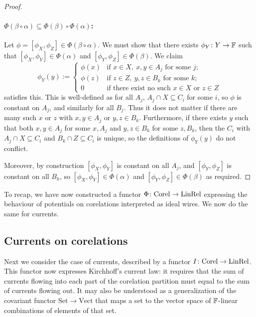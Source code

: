 \begin{proof}
  \paragraph{$\Phi(\beta\circ\alpha) \subseteq \Phi(\beta) \circ \Phi(\alpha)$:}
  Let $\phi = [\phi_X,\phi_Z] \in \Phi(\beta\circ\alpha)$. We must show that there
  exists $\phi_Y{\colon} Y \to {\mathbb F}$ such that $[\phi_X,\phi_Y] \in \Phi(\alpha)$ and
  $[\phi_Y,\phi_Z] \in \Phi(\beta)$. We claim
  \[
    \phi_Y(y):= \begin{cases}
      \phi(x) & \mbox{if } x \in X, \: x,y \in A_j \mbox{ for some }j;\\
      \phi(z) & \mbox{if } z \in Z, \: y,z \in B_k \mbox{ for some }k;\\
      0 & \mbox{if there exist no such }x \in X \mbox{ or }z \in Z
    \end{cases}
  \]
  satisfies this. This is well-defined as for all $A_j$, $A_j \cap X \subseteq
  C_i$ for some $i$, so $\phi$ is constant on $A_j$, and similarly for all $B_j$.
  Thus it does not matter if there are many such $x$ or $z$ with $x, y \in A_j$ or
  $y,z \in B_k$.  Furthermore, if there exists $y$ such that both $x,y \in A_j$
  for some $x,A_j$ and $y,z \in B_k$ for some $z,B_k$, then the $C_i$ with $A_j
  \cap X \subseteq C_i$ and $B_k \cap Z \subseteq C_i$ is unique, so the
  definitions of $\phi_Y(y)$ do not conflict.

  Moreover, by construction $[\phi_X,\phi_Y]$ is constant on all $A_j$, and
  $[\phi_Y,\phi_Z]$ is constant on all $B_k$, so $[\phi_X,\phi_Y] \in
  \Phi(\alpha)$ and $[\phi_Y,\phi_Z] \in \Phi(\beta)$ as required.
\end{proof}

To recap, we have now constructed a functor $\Phi{\colon} \mathrm{Corel} \to
\mathrm{LinRel}$ expressing the behaviour of potentials on corelations interpreted
as ideal wires. We now do the same for currents.

\subsection{Currents on corelations}

Next we consider the case of currents, described by a functor $I{\colon}
\mathrm{Corel} \to \mathrm{LinRel}$. This functor now expresses Kirchhoff's
current law: it requires that the sum of currents flowing into each part of the
corelation partition must equal to the sum of currents flowing out.  It may also
be understood as a generalization of the covariant functor $\mathrm{Set} \to
\mathrm{Vect}$ that maps a set to the vector space of ${\mathbb F}$-linear combinations
of elements of that set.

